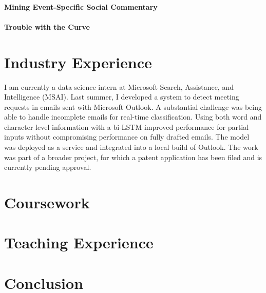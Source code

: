 \documentclass[letterpaper]{article}
\begin{document}
\paragraph{\textbf{Mining Event-Specific Social Commentary}}



\paragraph{\textbf{Trouble with the Curve}}


\section{Industry Experience}

I am currently a data science intern at Microsoft Search, Assistance, and Intelligence (MSAI). Last summer, I developed a system to detect meeting requests in emails sent with Microsoft Outlook. A substantial challenge was being able to handle incomplete emails for real-time classification. Using both word and character level information with a bi-LSTM improved performance for partial inputs without compromising performance on fully drafted emails. The model was deployed as a service and integrated into a local build of Outlook. The work was part of a broader project, for which a patent application has been filed and is currently pending approval.

\section{Coursework}


\section{Teaching Experience}


\section{Conclusion}


\newpage
\printbibliography
\nocite{*}
\end{document}
